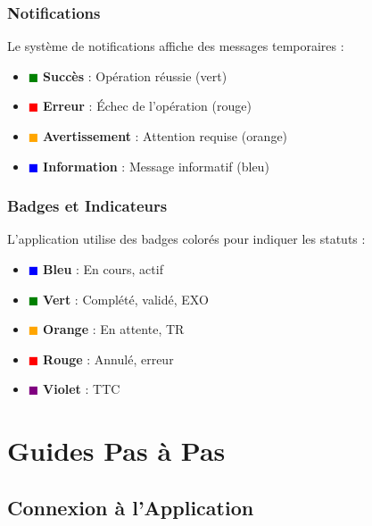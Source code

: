 \documentclass[12pt,a4paper]{report}
\begin{document}
\subsection{Notifications}

Le système de notifications affiche des messages temporaires :

\begin{itemize}[leftmargin=*]
    \item \textcolor{green}{$\blacksquare$} \textbf{Succès} : Opération réussie (vert)
    \item \textcolor{red}{$\blacksquare$} \textbf{Erreur} : Échec de l'opération (rouge)
    \item \textcolor{orange}{$\blacksquare$} \textbf{Avertissement} : Attention requise (orange)
    \item \textcolor{blue}{$\blacksquare$} \textbf{Information} : Message informatif (bleu)
\end{itemize}

\subsection{Badges et Indicateurs}

L'application utilise des badges colorés pour indiquer les statuts :

\begin{itemize}[leftmargin=*]
    \item \textcolor{blue}{$\blacksquare$} \textbf{Bleu} : En cours, actif
    \item \textcolor{green}{$\blacksquare$} \textbf{Vert} : Complété, validé, EXO
    \item \textcolor{orange}{$\blacksquare$} \textbf{Orange} : En attente, TR
    \item \textcolor{red}{$\blacksquare$} \textbf{Rouge} : Annulé, erreur
    \item \textcolor{purple}{$\blacksquare$} \textbf{Violet} : TTC
\end{itemize}

\chapter{Guides Pas à Pas}

\section{Connexion à l'Application}
\end{document}
